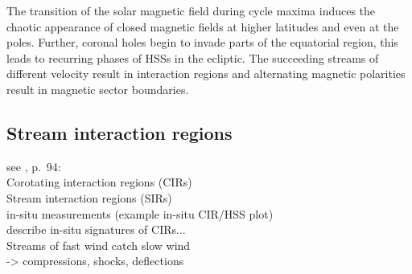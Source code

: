 The transition of the solar magnetic field during cycle maxima induces the chaotic appearance of closed magnetic fields at higher latitudes and even at the poles. Further, coronal holes begin to invade parts of the equatorial region, this leads to recurring phases of HSSs in the ecliptic. The succeeding streams of different velocity result in interaction regions and alternating magnetic polarities result in magnetic sector boundaries.\\


\subsection{Stream interaction regions}

see \citet{Balogh2009}, p.~94:\\

Corotating interaction regions (CIRs)\\
Stream interaction regions (SIRs)\\
in-situ measurements (example in-situ CIR/HSS plot)\\
describe in-situ signatures of CIRs...\\

Streams of fast wind catch slow wind\\
-> compressions, shocks, deflections\\

